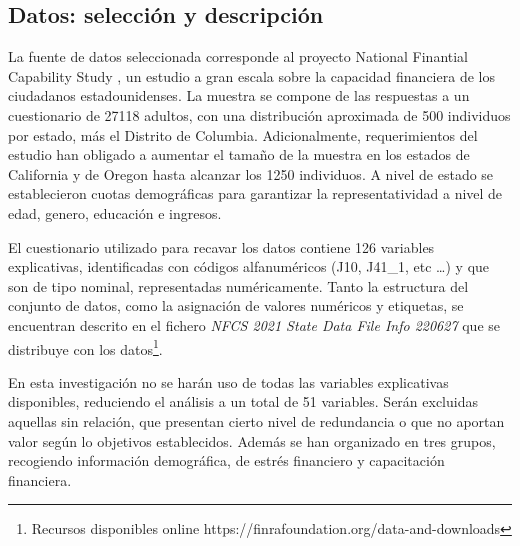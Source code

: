 \documentclass[a4paper, 11pt]{article}
\begin{document}
\subsection{Datos: selección y descripción}
\label{sec:sub:datasets}
La fuente de datos seleccionada corresponde al proyecto National Finantial Capability Study 
\cite{NFCS01}, un estudio a gran escala sobre la capacidad financiera de los ciudadanos 
estadounidenses. La muestra se compone de las respuestas a un cuestionario de 27118 adultos, 
con una distribución aproximada de 500 individuos por estado, más el Distrito de Columbia. 
Adicionalmente, requerimientos del estudio han obligado a aumentar el tamaño de la muestra en 
los estados de California y de Oregon hasta alcanzar los 1250 individuos. A nivel de estado 
se establecieron cuotas demográficas para garantizar la representatividad a nivel de edad,
genero, educación e ingresos.

El cuestionario utilizado para recavar los datos contiene 126 variables explicativas, 
identificadas con códigos alfanuméricos (J10, J41\_1, etc \dots) y que son de tipo nominal, 
representadas numéricamente. Tanto la estructura del conjunto de datos, como la asignación de 
valores numéricos y etiquetas, se encuentran descrito en el fichero \textit{NFCS 2021 State 
Data File Info 220627} que se distribuye con los datos\footnote{Recursos disponibles online 
https://finrafoundation.org/data-and-downloads}. 

En esta investigación no se harán uso de todas las variables explicativas disponibles, reduciendo el análisis a un total de 51 variables. Serán excluidas aquellas sin relación, que presentan cierto nivel de redundancia o que no aportan valor según lo
objetivos establecidos. Además se han organizado en tres grupos, recogiendo información demográfica, de estrés financiero y
capacitación financiera. 
\end{document}
